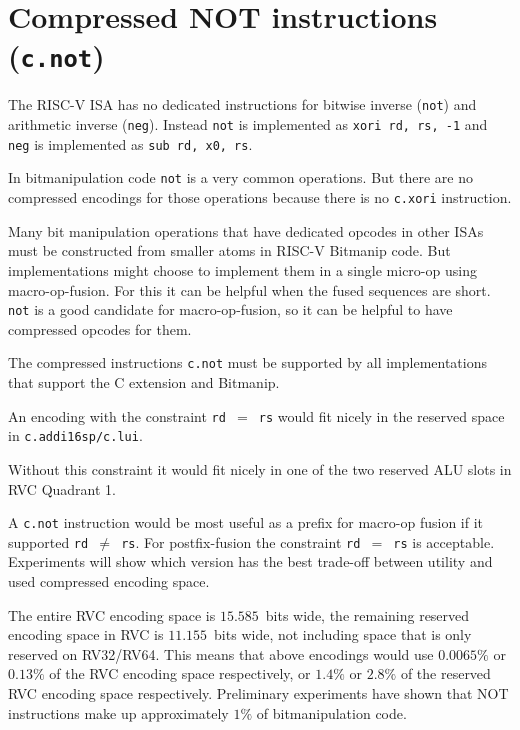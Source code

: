 \section{Compressed NOT instructions (\texttt{c.not})}

The RISC-V ISA has no dedicated instructions for bitwise inverse (\texttt{not})
and arithmetic inverse (\texttt{neg}). Instead \texttt{not} is implemented as
\texttt{xori\ rd,\ rs,\ -1} and \texttt{neg} is implemented as \texttt{sub\ rd,\ x0,\ rs}.

In bitmanipulation code \texttt{not} is a very common operations. But there are
no compressed encodings for those operations because there is no
\texttt{c.xori} instruction.

Many bit manipulation operations that have dedicated opcodes in other ISAs
must be constructed from smaller atoms in RISC-V Bitmanip code. But
implementations might choose to implement them in a single micro-op using
macro-op-fusion. For this it can be helpful when the fused sequences are short.
\texttt{not} is a good candidate for macro-op-fusion, so it can be helpful to
have compressed opcodes for them.

The compressed instructions \texttt{c.not} must be supported by all
implementations that support the C extension and Bitmanip.

An encoding with the constraint \texttt{rd $=$ rs} would fit nicely in the reserved
space in \texttt{c.addi16sp/c.lui}.



Without this constraint it would fit nicely in one of the two reserved ALU slots in
RVC Quadrant 1.



A \texttt{c.not} instruction would be most useful as a prefix for macro-op fusion
if it supported \texttt{rd $\neq$ rs}. For postfix-fusion the constraint \texttt{rd $=$ rs}
is acceptable. Experiments will show which version has the best trade-off between
utility and used compressed encoding space.

The entire RVC encoding space is $15.585$~bits wide, the remaining reserved
encoding space in RVC is $11.155$~bits wide, not including space that is only reserved
on RV32/RV64. This means that above encodings would use $0.0065\%$ or $0.13\%$
of the RVC encoding space respectively, or $1.4\%$ or $2.8\%$ of the reserved
RVC encoding space respectively. Preliminary experiments have shown that NOT
instructions make up approximately $1\%$ of bitmanipulation code.~\cite{Wolf17A}

